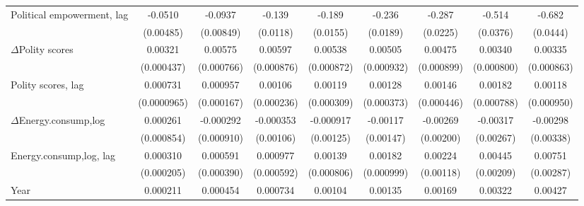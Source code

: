 \begin{table}[htbp]
\begin{tabular}{l*{8}{c}}
Political empowerment, lag  &     -0.0510\sym{***}&     -0.0937\sym{***}&      -0.139\sym{***}&      -0.189\sym{***}&      -0.236\sym{***}&      -0.287\sym{***}&      -0.514\sym{***}&      -0.682\sym{***}\\
                    &   (0.00485)         &   (0.00849)         &    (0.0118)         &    (0.0155)         &    (0.0189)         &    (0.0225)         &    (0.0376)         &    (0.0444)         \\
[1em]
$\Delta$Polity scores           &     0.00321\sym{***}&     0.00575\sym{***}&     0.00597\sym{***}&     0.00538\sym{***}&     0.00505\sym{***}&     0.00475\sym{***}&     0.00340\sym{***}&     0.00335\sym{***}\\
                    &  (0.000437)         &  (0.000766)         &  (0.000876)         &  (0.000872)         &  (0.000932)         &  (0.000899)         &  (0.000800)         &  (0.000863)         \\
[1em]
Polity scores, lag           &    0.000731\sym{***}&    0.000957\sym{***}&     0.00106\sym{***}&     0.00119\sym{***}&     0.00128\sym{***}&     0.00146\sym{***}&     0.00182\sym{**} &     0.00118         \\
                    & (0.0000965)         &  (0.000167)         &  (0.000236)         &  (0.000309)         &  (0.000373)         &  (0.000446)         &  (0.000788)         &  (0.000950)         \\
[1em]
$\Delta$Energy.consump,log             &    0.000261         &   -0.000292         &   -0.000353         &   -0.000917         &    -0.00117         &    -0.00269         &    -0.00317         &    -0.00298         \\
                    &  (0.000854)         &  (0.000910)         &   (0.00106)         &   (0.00125)         &   (0.00147)         &   (0.00200)         &   (0.00267)         &   (0.00338)         \\
[1em]
Energy.consump,log, lag             &    0.000310         &    0.000591         &    0.000977         &     0.00139\sym{*}  &     0.00182\sym{*}  &     0.00224\sym{*}  &     0.00445\sym{**} &     0.00751\sym{***}\\
                    &  (0.000205)         &  (0.000390)         &  (0.000592)         &  (0.000806)         &  (0.000999)         &   (0.00118)         &   (0.00209)         &   (0.00287)         \\
[1em]
Year                &    0.000211\sym{***}&    0.000454\sym{***}&    0.000734\sym{***}&     0.00104\sym{***}&     0.00135\sym{***}&     0.00169\sym{***}&     0.00322\sym{***}&     0.00427\sym{***}\\

\end{tabular}
\end{table}
